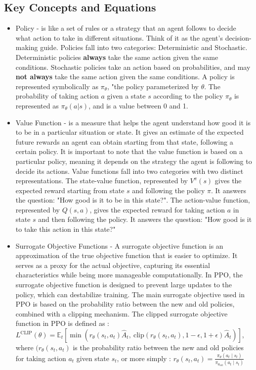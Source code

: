 \documentclass[12pt,oneside,letterpaper]{article}
\begin{document}
\subsection{Key Concepts and Equations}
\begin{itemize} 
\item Policy -  is like a set of rules or a strategy that an agent follows to decide what action to take in different situations. Think of it as the agent's decision-making guide. Policies fall into two categories: Deterministic and Stochastic. Deterministic policies \textbf{always} take the same action given the same conditions. Stochastic policies take an action based on probabilities, and may \textbf{not always} take the same action given the same conditions. A policy is represented symbolically as $\pi_{\theta}$, "the policy parameterized by $\theta$. The probability of taking action $a$ given a state $s$ according to the policy $\pi_{\theta}$ is represented as $\pi_{\theta} (a | s )$, and is a value between 0 and 1.
\item Value Function -  is a measure that helps the agent understand how good it is to be in a particular situation or state. It gives an estimate of the expected future rewards an agent can obtain starting from that state, following a certain policy. It is important to note that the value function is based on a particular policy, meaning it depends on the strategy the agent is following to decide its actions. Value functions fall into two categories with two distinct representations. The state-value function, represented by $V^{\pi}(s)$ gives the expected reward starting from state $s$ and following the policy $\pi$. It answers the question: "How good is it to be in this state?". The action-value function, represented by $Q ( s,a )$, gives the expected reward for taking action $a$ in state $s$ and then following the policy. It answers the question: "How good is it to take this action in this state?"
\item Surrogate Objective Functions - A surrogate objective function is an approximation of the true objective function that is easier to optimize. It serves as a proxy for the actual objective, capturing its essential characteristics while being more manageable computationally. In PPO, the surrogate objective function is designed to prevent large updates to the policy, which can destabilize training. The main surrogate objective used in PPO is based on the probability ratio between the new and old policies, combined with a clipping mechanism. The clipped surrogate objective function in PPO is defined as : \(L^{\text{CLIP}}(\theta) = \mathbb{E}_t \left[ \min \left( r_\theta(s_t, a_t) \hat{A}_t, \ \text{clip}(r_\theta(s_t, a_t), 1 - \epsilon, 1 + \epsilon) \hat{A}_t \right) \right] \), where $(r_\theta(s_t, a_t)$ is the probability ratio between the new and old policies for taking action $a_t$ given state $s_t$, or more simply : \( r_\theta(s_t, a_t) = \frac{\pi_\theta(a_t \mid s_t)}{\pi_{\theta_{\text{old}}}(a_t \mid s_t)}
\)

\end{itemize}
\end{document}
